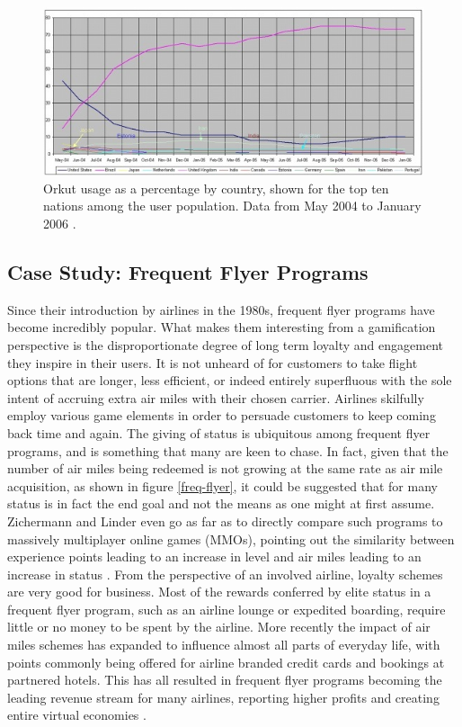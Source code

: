 \documentclass[12pt,a4paper,twoside]{report}
\begin{document}
\begin{figure}
\begin{center}
	\includegraphics{../img/orkut-brazil.jpg}
	\caption{Orkut usage as a percentage by country, shown for the top ten nations among the user population. Data from May 2004 to January 2006 \cite{fragoso2006wtf}.}
	\label{orkut-brazil}
\end{center}
\end{figure}

\subsection{Case Study: Frequent Flyer Programs}
Since their introduction by airlines in the 1980s, frequent flyer programs have become incredibly popular. What makes them interesting from a gamification perspective is the disproportionate degree of long term loyalty and engagement they inspire in their users. It is not unheard of for customers to take flight options that are longer, less efficient, or indeed entirely superfluous with the sole intent of accruing extra air miles with their chosen carrier. Airlines skilfully employ various game elements in order to persuade customers to keep coming back time and again. The giving of status is ubiquitous among frequent flyer programs, and is something that many are keen to chase. In fact, given that the number of air miles being redeemed is not growing at the same rate as air mile acquisition, as shown in figure \ref{freq-flyer}, it could be suggested that for many status is in fact the end goal and not the means as one might at first assume. Zichermann and Linder even go as far as to directly compare such programs to massively multiplayer online games (MMOs), pointing out the similarity between experience points leading to an increase in level and air miles leading to an increase in status \cite{zichermann2010game}. From the perspective of an involved airline, loyalty schemes are very good for business. Most of the rewards conferred by elite status in a frequent flyer program, such as an airline lounge or expedited boarding, require little or no money to be spent by the airline. More recently the impact of air miles schemes has expanded to influence almost all parts of everyday life, with points commonly being offered for airline branded credit cards and bookings at partnered hotels. This has all resulted in frequent flyer programs becoming the leading revenue stream for many airlines, reporting higher profits and creating entire virtual economies \cite{zichermann2010game}.
\end{document}
